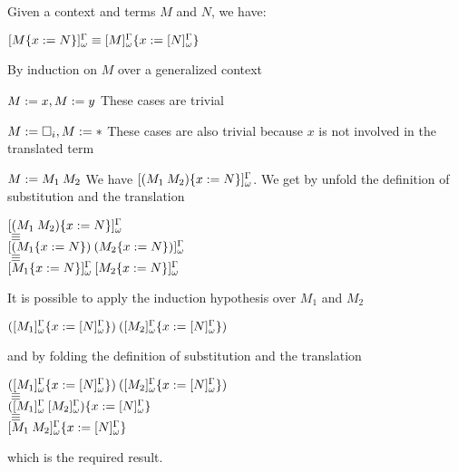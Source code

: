 \begin{Lemma}[Substitution]
\label{lemma:wtrans_substitution}
Given a context \Context{} and terms $M$ and $N$, we have:
\begin{center}
    $\WTrans{\subst{M}{x}{N}} \equiv \subst{\WTrans{M}}{x}{\WTrans{N}}$
\end{center}
\end{Lemma}

\begin{Proof}
By induction on $M$ over a generalized context
\begin{ProofCase}{$M := x, M := y$}
These cases are trivial
\end{ProofCase}

\begin{ProofCase}{$M \termDef \Type, M \termDef \Prop$}
These cases are also trivial because $x$ is not involved in the translated term
\end{ProofCase}

\begin{ProofCase}{$M \termDef \app{M_1}{M_2}$}
We have $\WTrans{\subst{(\app{M_1}{M_2})}{x}{N}}$. We get by unfold the definition of substitution and 
the translation
\begin{center}
$\WTrans{\subst{(\app{M_1}{M_2})}{x}{N}}$ 
\\ $\equiv$ \\
$\WTrans{
    \app{(\subst{M_1}{x}{N})}{(\subst{M_2}{x}{N})}
}$
\\ $\equiv$ \\
$\app{
    \WTrans{\subst{M_1}{x}{N}}
}{
    \WTrans{\subst{M_2}{x}{N}}
}
$
\end{center}
It is possible to apply the induction hypothesis over $M_1$ and $M_2$
\begin{center}
$\app{
    (\subst{\WTrans{M_1}}{x}{\WTrans{N}})
}{
    (\subst{\WTrans{M_2}}{x}{\WTrans{N}})
}$
\end{center}
and by folding the definition of substitution and the translation
\begin{center}
$\app{
    (\subst{\WTrans{M_1}}{x}{\WTrans{N}})
}{
    (\subst{\WTrans{M_2}}{x}{\WTrans{N}})
}$
\\ $\equiv$ \\
$\subst{(\app{\WTrans{M_1}}{\WTrans{M_2}})}{x}{\WTrans{N}}$
\\ $\equiv$ \\
$\subst{\WTrans{\app{M_1}{M_2}}}{x}{\WTrans{N}}$
\end{center}
which is the required result.
\end{ProofCase}


\end{Proof}
